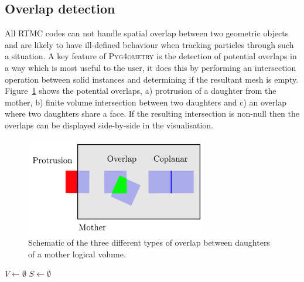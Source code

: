 \documentclass[final,5p,times,twocolumn]{elsarticle}
\newcommand{\PYGEOMETRY}{\textsc{Pyg4ometry}}
\begin{document}
\subsection{Overlap detection}
All RTMC codes can not handle spatial overlap between two geometric objects and are likely to have ill-defined behaviour when tracking particles  
through such a situation.  A key feature of \PYGEOMETRY{} is the detection of potential overlaps in a way which is most useful to the user, it does this by performing an intersection operation between solid instances and determining if the resultant mesh is empty. Figure~\ref{fig:overlap} shows the potential overlaps, a) protrusion of a daughter from the mother, b)  finite volume intersection between two daughters  and c) an overlap where two daughters share a face. If the resulting intersection 
is non-null then the overlaps can be displayed side-by-side in the visualisation. 
\begin{figure}[htbp]
\begin{center}
\includegraphics[width=8cm]{./diagrams/overlap.pdf}
\caption{Schematic of the three different types of overlap between daughters of a mother logical volume.}
\label{fig:overlap}
\end{center}
\end{figure} 

\begin{algorithm}[h]
  \SetAlgoLined
$V \longleftarrow \emptyset$\;
$S \longleftarrow \emptyset$\;

\label{algo:overlap}
\caption{The overlap checking algorithm employed in \PYGEOMETRY{}.}
\end{algorithm}
\end{document}
